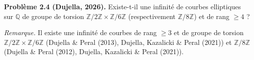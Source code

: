 \textbf{Problème 2.4 (Dujella, 2026).} Existe-t-il une infinité de courbes elliptiques sur $\mathbb{Q}$ de groupe de torsion $\mathbb{Z}/2\mathbb{Z}\times\mathbb{Z}/6\mathbb{Z}$ (respectivement $\mathbb{Z}/8\mathbb{Z}$) et de rang $\geqslant 4$ ?

\medskip

\textit{Remarque.} Il existe une infinité de courbes de rang $\geqslant 3$ et de groupe de torsion $\mathbb{Z}/2\mathbb{Z}\times\mathbb{Z}/6\mathbb{Z}$ (Dujella \& Peral (2013), Dujella, Kazalicki \& Peral (2021)) et $\mathbb{Z}/8\mathbb{Z}$ (Dujella \& Peral (2012), Dujella, Kazalicki \& Peral (2021)).
